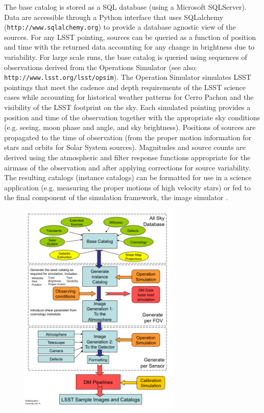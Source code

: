 \documentclass[]{article}
\begin{document}
{The base catalog is stored as a SQL database (using a Microsoft
SQLServer). Data are accessible through a Python interface that uses
SQLalchemy ({\tt http://www.sqlalchemy.org}) to provide a database 
agnostic view of the sources. For any
LSST pointing, sources can be queried as a function of position and
time with the returned data accounting for any change in brightness
due to variability. For large scale runs, the base catalog is queried
using sequences of observations derived from the Operations Simulator
\citep{cook09} (see also: {\tt http://www.lsst.org/lsst/opsim}). 
The Operation Simulator simulates LSST pointings that
meet the cadence and depth requirements of the LSST science cases
while accounting for historical weather patterns for Cerro Pachon and
the visibility of the LSST footprint on the sky. Each simulated
pointing provides a position and time of the observation together with
the appropriate sky conditions (e.g. seeing, moon phase and angle, and
sky brightness). Positions of sources are propagated to the time of
observation (from the proper motion information for stars and orbits
for Solar System sources). Magnitudes and source counts are derived
using the atmospheric and filter response functions appropriate for
the airmass of the observation and after applying corrections for
source variability. The resulting catalogs (instance catalogs) can be
formatted for use in a science application (e.g. measuring the proper
motions of high velocity stars) or fed to the final component of the
simulation framework, the image simulator \citep{phosim}. 
\begin{figure}[H]
\centerline{\includegraphics[width=3in]{validation_figures/flow.png}}

\end{figure}}
\end{document}
